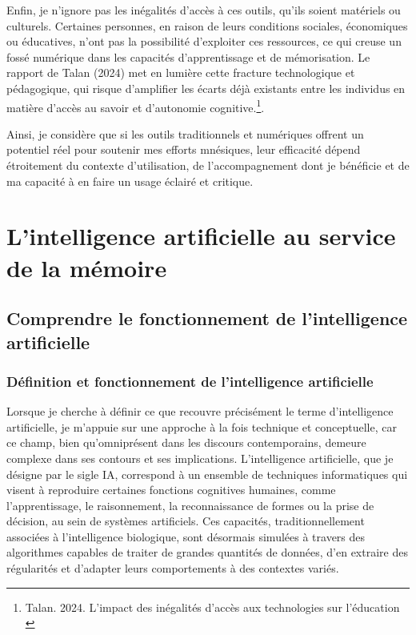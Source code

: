 \documentclass[11pt,a4paper]{report}
\begin{document}
Enfin, je n’ignore pas les inégalités d’accès à ces outils, qu’ils soient matériels ou culturels. Certaines personnes, en raison de leurs conditions sociales, économiques ou éducatives, n’ont pas la possibilité d’exploiter ces ressources, ce qui creuse un fossé numérique dans les capacités d’apprentissage et de mémorisation. Le rapport de Talan (2024) met en lumière cette fracture technologique et pédagogique, qui risque d’amplifier les écarts déjà existants entre les individus en matière d’accès au savoir et d’autonomie cognitive.\footnote{Talan. 2024. L'impact des inégalités d'accès aux technologies sur l'éducation \cite{talan}}.

Ainsi, je considère que si les outils traditionnels et numériques offrent un potentiel réel pour soutenir mes efforts mnésiques, leur efficacité dépend étroitement du contexte d’utilisation, de l’accompagnement dont je bénéficie et de ma capacité à en faire un usage éclairé et critique.

\chapter{L’intelligence artificielle au service de la mémoire}

\section{Comprendre le fonctionnement de l’intelligence artificielle}

\subsection{Définition et fonctionnement de l’intelligence artificielle}

Lorsque je cherche à définir ce que recouvre précisément le terme d’intelligence artificielle, je m’appuie sur une approche à la fois technique et conceptuelle, car ce champ, bien qu’omniprésent dans les discours contemporains, demeure complexe dans ses contours et ses implications. L’intelligence artificielle, que je désigne par le sigle IA, correspond à un ensemble de techniques informatiques qui visent à reproduire certaines fonctions cognitives humaines, comme l’apprentissage, le raisonnement, la reconnaissance de formes ou la prise de décision, au sein de systèmes artificiels. Ces capacités, traditionnellement associées à l’intelligence biologique, sont désormais simulées à travers des algorithmes capables de traiter de grandes quantités de données, d’en extraire des régularités et d’adapter leurs comportements à des contextes variés.
\end{document}
